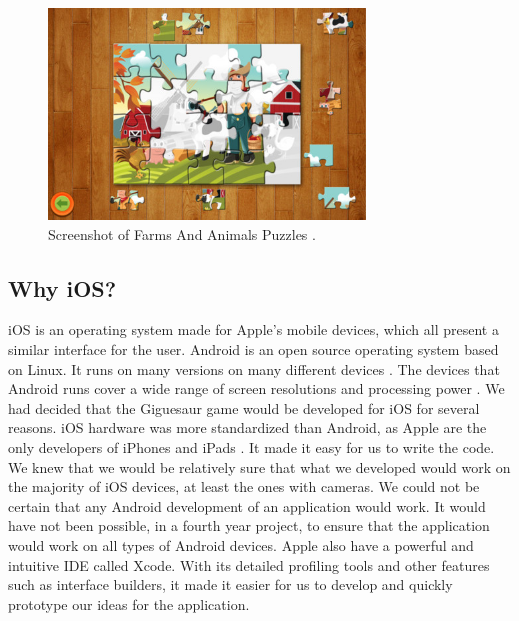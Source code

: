\documentclass{article}
\begin{document}
\begin{figure}[ht]
\begin{center}
\includegraphics[width=0.75\textwidth]{images/FarmAnimalsJigsawImage}
\caption{Screenshot of Farms And Animals Puzzles \cite{img:FarmPuzzle}.}
\label{fig:FarmsAnimals}
\end{center}
\end{figure}

\subsection{Why iOS?}
\gls{iOS} is an operating system made for Apple's mobile devices, which all
present a similar interface for the user. \gls{Android} is an open source
operating system based on Linux. It runs on many versions on many different
devices \cite{ref:AndroidDevices}. The devices that Android runs cover a wide
range of screen resolutions and processing power \cite{ref:AndroidHardware}. We
had decided that the Giguesaur game would be developed for iOS for several
reasons. iOS hardware was more standardized than Android, as Apple are the only
developers of iPhones and iPads \cite{ref:iOSHardware}. It made it easy for us
to write the code. We knew that we would be relatively sure that what we
developed would work on the majority of iOS devices, at least the ones with
cameras. We could not be certain that any Android development of an application
would work. It would have not been possible, in a fourth year project, to ensure
that the application would work on all types of Android devices. Apple also have
a powerful and intuitive \gls{IDE} called \gls{Xcode}. With its detailed
profiling tools and other features such as interface builders, it made it easier
for us to develop and quickly prototype our ideas for the application.

\end{document}

